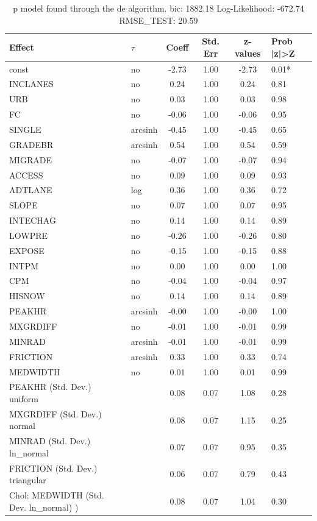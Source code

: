 \begin{table}
	\caption{p model found through the de algorithm. bic: 1882.18 Log-Likelihood: -672.74 RMSE_TEST: 20.59}
	\begin{center}
		\begin{tabular}{|l|l|c|c|c|l|}
			\hline
			Effect & $\tau$ & Coeff & Std. Err & z-values & Prob |z|>Z \\
			\hline
			const & no & -2.73 & 1.00 & -2.73 & 0.01* \\
			\hline
			INCLANES & no & 0.24 & 1.00 & 0.24 & 0.81 \\
			\hline
			URB & no & 0.03 & 1.00 & 0.03 & 0.98 \\
			\hline
			FC & no & -0.06 & 1.00 & -0.06 & 0.95 \\
			\hline
			SINGLE & arcsinh & -0.45 & 1.00 & -0.45 & 0.65 \\
			\hline
			GRADEBR & arcsinh & 0.54 & 1.00 & 0.54 & 0.59 \\
			\hline
			MIGRADE & no & -0.07 & 1.00 & -0.07 & 0.94 \\
			\hline
			ACCESS & no & 0.09 & 1.00 & 0.09 & 0.93 \\
			\hline
			ADTLANE & log & 0.36 & 1.00 & 0.36 & 0.72 \\
			\hline
			SLOPE & no & 0.07 & 1.00 & 0.07 & 0.95 \\
			\hline
			INTECHAG & no & 0.14 & 1.00 & 0.14 & 0.89 \\
			\hline
			LOWPRE & no & -0.26 & 1.00 & -0.26 & 0.80 \\
			\hline
			EXPOSE & no & -0.15 & 1.00 & -0.15 & 0.88 \\
			\hline
			INTPM & no & 0.00 & 1.00 & 0.00 & 1.00 \\
			\hline
			CPM & no & -0.04 & 1.00 & -0.04 & 0.97 \\
			\hline
			HISNOW & no & 0.14 & 1.00 & 0.14 & 0.89 \\
			\hline
			PEAKHR & arcsinh & -0.00 & 1.00 & -0.00 & 1.00 \\
			\hline
			MXGRDIFF & no & -0.01 & 1.00 & -0.01 & 0.99 \\
			\hline
			MINRAD & arcsinh & -0.01 & 1.00 & -0.01 & 0.99 \\
			\hline
			FRICTION & arcsinh & 0.33 & 1.00 & 0.33 & 0.74 \\
			\hline
			MEDWIDTH & no & 0.01 & 1.00 & 0.01 & 0.99 \\
			\hline
			PEAKHR (Std. Dev.) uniform &  & 0.08 & 0.07 & 1.08 & 0.28 \\
			\hline
			MXGRDIFF (Std. Dev.) normal &  & 0.08 & 0.07 & 1.15 & 0.25 \\
			\hline
			MINRAD (Std. Dev.) ln_normal &  & 0.07 & 0.07 & 0.95 & 0.35 \\
			\hline
			FRICTION (Std. Dev.) triangular &  & 0.06 & 0.07 & 0.79 & 0.43 \\
			\hline
			 Chol: MEDWIDTH (Std. Dev. ln_normal) ) &  & 0.08 & 0.07 & 1.04 & 0.30 \\
			\hline
		\end{tabular}
	\end{center}
\end{table}